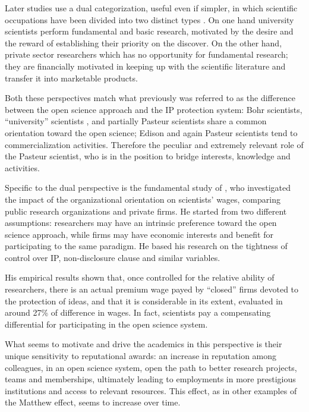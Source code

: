 Later studies use a dual categorization, useful even if simpler, in which scientific occupations have been divided into two distinct types \citep{Beath2000}. On one hand university scientists perform fundamental and basic research, motivated by the desire and the reward of establishing their priority on the discover. On the other hand, private sector researchers which has no opportunity for fundamental research; they are financially motivated in keeping up with the scientific literature and transfer it into marketable products. 

Both these perspectives match what previously was referred to as the difference between the open science approach and the IP protection system: Bohr scientists, \enquote{university} scientists \citep{Beath2000}, and partially Pasteur scientists share a common orientation toward the open science; Edison and again Pasteur scientists tend to commercialization activities. Therefore the peculiar and extremely relevant role of the Pasteur scientist, who is in the position to bridge interests, knowledge and activities.

Specific to the dual perspective is the fundamental study of \citet{Stern2004}, who investigated the impact of the organizational orientation on scientists' wages, comparing public research organizations and private firms. He started from two different assumptions: researchers may have an intrinsic preference toward the open science approach, while firms may have economic interests and benefit for participating to the same paradigm. He based his research on the tightness of control over IP, non-disclosure clause and similar variables.

His empirical results shown that, once controlled for the relative ability of researchers, there is an actual premium wage payed by \enquote{closed} firms devoted to the protection of ideas, and that it is considerable in its extent, evaluated in around 27\% of difference in wages. In fact, scientists pay a compensating differential for participating in the open science system. 

What seems to motivate and drive the academics in this perspective is their unique sensitivity to reputational awards: an increase in reputation among colleagues, in an open science system, open the path to better research projects, teams and memberships, ultimately leading to employments in more prestigious institutions and access to relevant resources. This effect, as in other examples of the Matthew effect, seems to increase over time.

